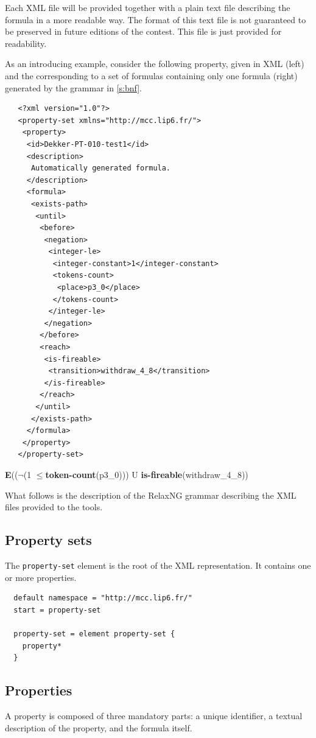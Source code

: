 \documentclass[10pt,english,a4paper]{article}
\newcommand\ctle             {\textbf{E}\xspace}
\newcommand\logicnot         {\boldmath$\lnot$\xspace}
\newcommand\atomleq          {\boldmath$\leq$\xspace}
\newcommand\atomisfire[1]    {\textbf{is-fireable}(#1)}
\newcommand\atomtokenscnt[1] {\textbf{token-count}(#1)}
\begin{document}
Each XML file will be provided together with a plain text file describing
the formula in a more readable way.
The format of this text file is not guaranteed to be preserved in future
editions of the contest. This file is just provided for readability.

As an introducing example, consider the following property, given in XML
(left) and the corresponding to a set of formulas containing only one
formula (right) generated by the grammar in \cref{s:bnf}.

\begin{multicols}{2}
\begin{lstlisting}
   <?xml version="1.0"?>
   <property-set xmlns="http://mcc.lip6.fr/">
    <property>
     <id>Dekker-PT-010-test1</id>
     <description>
      Automatically generated formula.
     </description>
     <formula>
      <exists-path>
       <until>
        <before>
         <negation>
          <integer-le>
           <integer-constant>1</integer-constant>
           <tokens-count>
            <place>p3_0</place>
           </tokens-count>
          </integer-le>
         </negation>
        </before>
        <reach>
         <is-fireable>
          <transition>withdraw_4_8</transition>
         </is-fireable>
        </reach>
       </until>
      </exists-path>
     </formula>
    </property>
   </property-set>
\end{lstlisting}
\columnbreak
\vspace*{2cm}
\ctle ((\logicnot (1 \atomleq \atomtokenscnt{p3\_0})) U \atomisfire{withdraw\_4\_8})
\end{multicols}

What follows is the description of the RelaxNG grammar describing the XML
files provided to the tools.

\subsection{Property sets}
The \lstinline[language=xsd]!property-set! element is the root of the XML representation.
It contains one or more properties.
\begin{lstlisting}
  default namespace = "http://mcc.lip6.fr/"
  start = property-set

  property-set = element property-set {
    property*
  }
\end{lstlisting}

\subsection{Properties}
A property is composed of three mandatory parts: a unique identifier, a textual description
of the property, and the formula itself.
\end{document}
